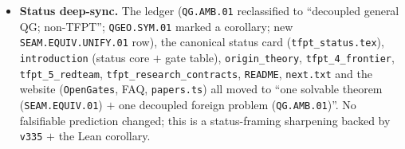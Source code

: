 \begin{itemize}
$+$ cited BW/net axioms). \texttt{lake build} green (3362 jobs).
\item \textbf{Status deep-sync.} The ledger (\texttt{QG.AMB.01} reclassified to ``decoupled general QG; non-TFPT'';
\texttt{QGEO.SYM.01} marked a corollary; new \texttt{SEAM.EQUIV.UNIFY.01} row), the canonical status card
(\texttt{tfpt\_status.tex}), \texttt{introduction} (status core $+$ gate table), \texttt{origin\_theory},
\texttt{tfpt\_4\_frontier}, \texttt{tfpt\_5\_redteam}, \texttt{tfpt\_research\_contracts}, \texttt{README},
\texttt{next.txt} and the website (\texttt{OpenGates}, FAQ, \texttt{papers.ts}) all moved to ``one solvable theorem
(\texttt{SEAM.EQUIV.01}) $+$ one decoupled foreign problem (\texttt{QG.AMB.01})''. No falsifiable prediction
changed; this is a status-framing sharpening backed by \texttt{v335} $+$ the Lean corollary.
\end{itemize}

